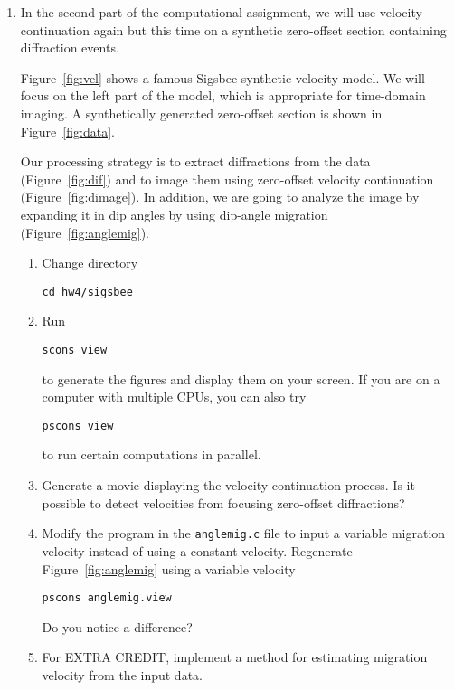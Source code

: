 \begin{enumerate}
\lstset{language=python,numbers=left,numberstyle=\tiny,showstringspaces=false}


\item In the second part of the computational assignment, we will use velocity continuation again but
  this time on a synthetic zero-offset section containing diffraction
  events.

  Figure~\ref{fig:vel} shows a famous Sigsbee synthetic velocity
  model. We will focus on the left part of the model, which is
  appropriate for time-domain imaging. A synthetically generated
  zero-offset section is shown in Figure~\ref{fig:data}. 
  
  Our processing strategy is to extract diffractions from the data
  (Figure~\ref{fig:dif}) and to image them using zero-offset velocity
  continuation (Figure~\ref{fig:dimage}). In addition, we are going to
  analyze the image by expanding it in dip angles by using dip-angle
  migration (Figure~\ref{fig:anglemig}).


\begin{enumerate}
\item Change directory 
\begin{verbatim}
cd hw4/sigsbee
\end{verbatim}
\item Run
\begin{verbatim}
scons view
\end{verbatim}
to generate the figures and display them on your screen.
If you are on a computer with multiple CPUs, you
can also try
\begin{verbatim}
pscons view
\end{verbatim}
to run certain computations in parallel.
\item Generate a movie displaying the velocity continuation process. Is it possible to detect velocities from focusing zero-offset diffractions?
\item Modify the program in the \texttt{anglemig.c} file to input a variable migration velocity instead of using a constant velocity. 
Regenerate Figure~\ref{fig:anglemig} using a variable velocity 
\begin{verbatim}
pscons anglemig.view
\end{verbatim}
Do you notice a difference?
\item For EXTRA CREDIT, implement a method for estimating migration
  velocity from the input data.
\end{enumerate}


\end{enumerate}
